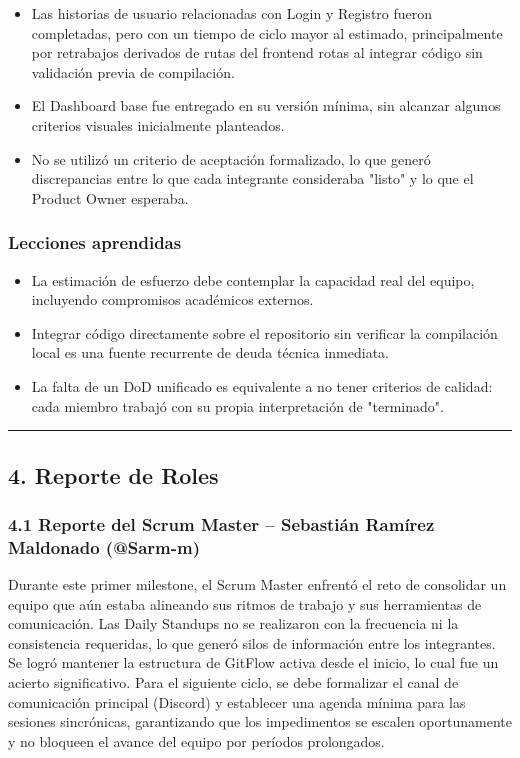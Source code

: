 \documentclass[11pt,a4paper]{article}
\begin{document}
\begin{itemize}[leftmargin=1.2em]
\item Las historias de usuario relacionadas con Login y Registro fueron completadas, pero con un tiempo de ciclo mayor al estimado, principalmente por retrabajos derivados de rutas del frontend rotas al integrar código sin validación previa de compilación.
\item El Dashboard base fue entregado en su versión mínima, sin alcanzar algunos criterios visuales inicialmente planteados.
\item No se utilizó un criterio de aceptación formalizado, lo que generó discrepancias entre lo que cada integrante consideraba "listo" y lo que el Product Owner esperaba.
\end{itemize}

\subsubsection{Lecciones aprendidas}

\begin{itemize}[leftmargin=1.2em]
\item La estimación de esfuerzo debe contemplar la capacidad real del equipo, incluyendo compromisos académicos externos.
\item Integrar código directamente sobre el repositorio sin verificar la compilación local es una fuente recurrente de deuda técnica inmediata.
\item La falta de un DoD unificado es equivalente a no tener criterios de calidad: cada miembro trabajó con su propia interpretación de "terminado".
\end{itemize}

\vspace{0.6em}\hrule\vspace{0.8em}

\subsection{4. Reporte de Roles}

\subsubsection{4.1 Reporte del Scrum Master -- Sebastián Ramírez Maldonado (@Sarm-m)}

Durante este primer milestone, el Scrum Master enfrentó el reto de consolidar un equipo que aún estaba alineando sus ritmos de trabajo y sus herramientas de comunicación. Las Daily Standups no se realizaron con la frecuencia ni la consistencia requeridas, lo que generó silos de información entre los integrantes. Se logró mantener la estructura de GitFlow activa desde el inicio, lo cual fue un acierto significativo. Para el siguiente ciclo, se debe formalizar el canal de comunicación principal (Discord) y establecer una agenda mínima para las sesiones sincrónicas, garantizando que los impedimentos se escalen oportunamente y no bloqueen el avance del equipo por períodos prolongados.
\end{document}

